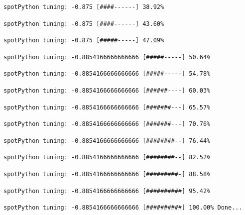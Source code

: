 \documentclass[
  letterpaper,
  DIV=11,
  numbers=noendperiod]{scrreprt}
\begin{document}
\begin{verbatim}
spotPython tuning: -0.875 [####------] 38.92% 
\end{verbatim}

\begin{verbatim}
spotPython tuning: -0.875 [####------] 43.60% 
\end{verbatim}

\begin{verbatim}
spotPython tuning: -0.875 [#####-----] 47.09% 
\end{verbatim}

\begin{verbatim}
spotPython tuning: -0.8854166666666666 [#####-----] 50.64% 
\end{verbatim}

\begin{verbatim}
spotPython tuning: -0.8854166666666666 [#####-----] 54.78% 
\end{verbatim}

\begin{verbatim}
spotPython tuning: -0.8854166666666666 [######----] 60.03% 
\end{verbatim}

\begin{verbatim}
spotPython tuning: -0.8854166666666666 [#######---] 65.57% 
\end{verbatim}

\begin{verbatim}
spotPython tuning: -0.8854166666666666 [#######---] 70.76% 
\end{verbatim}

\begin{verbatim}
spotPython tuning: -0.8854166666666666 [########--] 76.44% 
\end{verbatim}

\begin{verbatim}
spotPython tuning: -0.8854166666666666 [########--] 82.52% 
\end{verbatim}

\begin{verbatim}
spotPython tuning: -0.8854166666666666 [#########-] 88.58% 
\end{verbatim}

\begin{verbatim}
spotPython tuning: -0.8854166666666666 [##########] 95.42% 
\end{verbatim}

\begin{verbatim}
spotPython tuning: -0.8854166666666666 [##########] 100.00% Done...
\end{verbatim}
\end{document}
